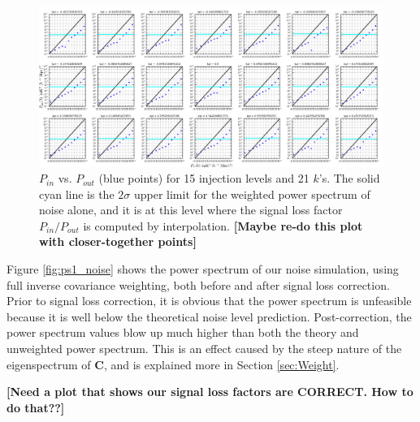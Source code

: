 \documentclass[preprint2,numberedappendix,tighten,twocolappendix]{aastex6}  %
\newcommand{\cc}[1]{{\color{purple} \textbf{[#1]}}}
\begin{document}
\begin{figure}
	\centering
	\includegraphics[width=1.0\textwidth]{sigloss1_noise.png}
	\caption{$P_{in}$ vs. $P_{out}$ (blue points) for 15 injection levels and 21 $k$'s. The solid cyan line is the $2\sigma$ upper limit for the weighted power spectrum of noise alone, and it is at this level where the signal loss factor $P_{in}/P_{out}$ is computed by interpolation. \cc{Maybe re-do this plot with closer-together points}}
	\label{fig:sigloss1_noise}
\end{figure}

Figure \ref{fig:ps1_noise} shows the power spectrum of our noise simulation, using full inverse covariance weighting, both before and after signal loss correction. Prior to signal loss correction, it is obvious that the power spectrum is unfeasible because it is well below the theoretical noise level prediction. Post-correction, the power spectrum values blow up much higher than both the theory and unweighted power spectrum. This is an effect caused by the steep nature of the eigenspectrum of $\textbf{C}$, and is explained more in Section \ref{sec:Weight}.

\cc{Need a plot that shows our signal loss factors are CORRECT. How to do that??}
\end{document}
